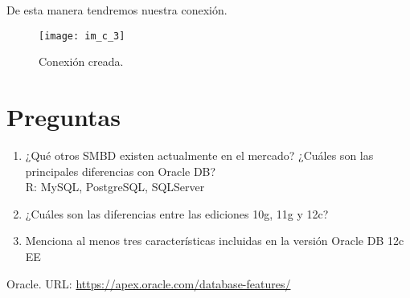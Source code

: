 \documentclass[10pt]{article}
\begin{document}
	De esta manera tendremos nuestra conexión.
	\begin{figure}[H]
		\centering
	\texttt{[image: im\_c\_3]}
	\caption{Conexión creada.}
    \end{figure}
	
	\section{Preguntas}
	\begin{enumerate}
		\item ¿Qué otros SMBD existen actualmente en el mercado? ¿Cuáles son las principales diferencias con Oracle DB?\\
		R: MySQL, PostgreSQL, SQLServer
        \item ¿Cuáles son las diferencias entre las ediciones 10g, 11g y 12c?\\
        \item Menciona al menos tres características incluidas en la versión Oracle DB 12c EE\\
	\end{enumerate}

\begin{thebibliography}{}
	\bibitem{}Oracle. URL: \url{https://apex.oracle.com/database-features/}
\end{thebibliography}

 
\end{document}

